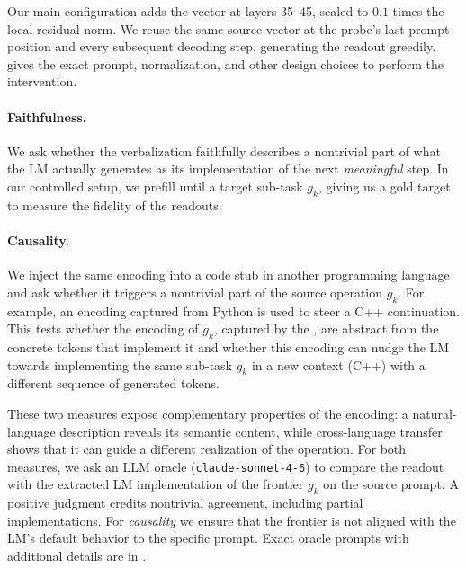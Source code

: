 Our main configuration adds the vector at layers 35--45, scaled to $0.1$ times the local residual norm. We reuse the same source vector at the probe's last prompt position and every subsequent decoding step, generating the readout greedily.  gives the exact prompt, normalization, and other design choices to perform the intervention.

\paragraph{Faithfulness.} We ask whether the verbalization faithfully describes a nontrivial part of what the LM actually generates as its implementation of the next \emph{meaningful} step. In our controlled setup, we prefill until a target sub-task $g_k$, giving us a gold target to measure the fidelity of the readouts.

\paragraph{Causality.} We inject the same encoding into a code stub in another programming language and ask whether it triggers a nontrivial part of the source operation $g_k$. For example, an encoding captured from Python is used to steer a C++ continuation. This tests whether the encoding of $g_k$, captured by the \goalheads, are abstract from the concrete tokens that implement it and whether this encoding can nudge the LM towards implementing the same sub-task $g_k$ in a new context (C++) with a different sequence of generated tokens.


These two measures expose complementary properties of the encoding: a natural-language description reveals its semantic content, while cross-language transfer shows that it can guide a different realization of the operation. For both measures, we ask an LLM oracle (\texttt{claude-sonnet-4-6}) to compare the readout with the extracted LM implementation of the frontier $g_k$ on the source prompt. A positive judgment credits nontrivial agreement, including partial implementations. For \emph{causality} we ensure that the frontier is not aligned with the LM's default behavior to the specific prompt. Exact oracle prompts with additional details are in .

